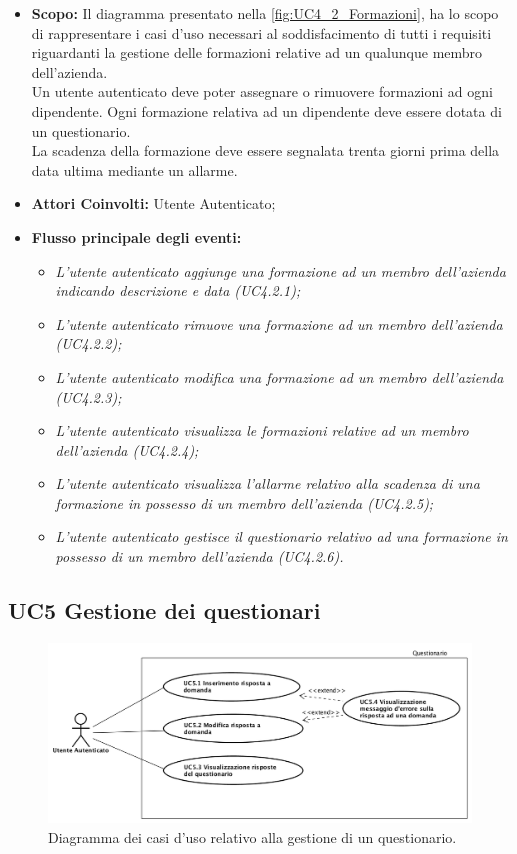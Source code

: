 		\begin{itemize}
			\item \textbf{Scopo:} Il diagramma presentato nella \autoref{fig:UC4_2_Formazioni}, ha lo scopo di rappresentare i casi d'uso necessari al soddisfacimento di tutti i requisiti riguardanti la gestione delle formazioni relative ad un qualunque membro dell'azienda. \\ 
			Un utente autenticato deve poter assegnare o rimuovere formazioni ad ogni dipendente. 
			Ogni formazione relativa ad un dipendente deve essere dotata di un questionario. \\ 
			La scadenza della formazione deve essere segnalata trenta giorni prima della data ultima mediante un allarme.
			\item \textbf{Attori Coinvolti:} Utente Autenticato;
			\item \textbf{Flusso principale degli eventi:} 
			\begin{itemize}
				\item \textit{L'utente autenticato aggiunge una formazione ad un membro dell'azienda indicando descrizione e data (UC4.2.1);}
				\item \textit{L'utente autenticato rimuove una formazione ad un membro dell'azienda (UC4.2.2);}
				\item \textit{L'utente autenticato modifica una formazione ad un membro dell'azienda (UC4.2.3);}
				\item \textit{L'utente autenticato visualizza le formazioni relative ad un membro dell'azienda (UC4.2.4);}
				\item \textit{L'utente autenticato visualizza l'allarme relativo alla scadenza di una formazione in possesso di un membro dell'azienda (UC4.2.5);}
				\item \textit{L'utente autenticato gestisce il questionario relativo ad una formazione in possesso di un membro dell'azienda (UC4.2.6).}
			\end{itemize}
		\end{itemize}
		
	\newpage	
	\subsection{UC5 Gestione dei questionari}
		\label{section:UC5}	
			\begin{figure}[H]
				\begin{center}
					\includegraphics[width=15cm]{Pics/UC5QuestionarioUtenteAutenticato.png}
					\caption{Diagramma dei casi d'uso relativo alla gestione di un questionario.}
					\label{fig:UC5_Qestionari}
				\end{center}
			\end{figure}
			
